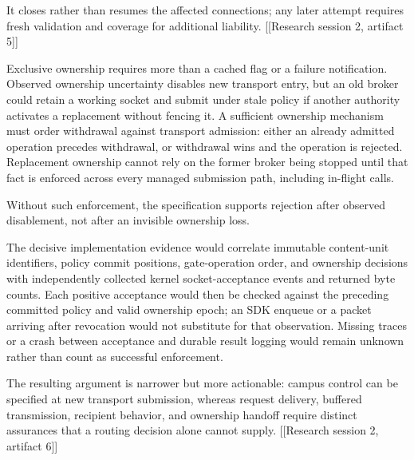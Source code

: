 \documentclass[11pt]{article}
\begin{document}
It closes rather than resumes the affected connections; any later attempt requires fresh validation and coverage for additional liability. [[Research session 2, artifact 5]]

Exclusive ownership requires more than a cached flag or a failure notification. Observed ownership uncertainty disables new transport entry, but an old broker could retain a working socket and submit under stale policy if another authority activates a replacement without fencing it. A sufficient ownership mechanism must order withdrawal against transport admission: either an already admitted operation precedes withdrawal, or withdrawal wins and the operation is rejected. Replacement ownership cannot rely on the former broker being stopped until that fact is enforced across every managed submission path, including in-flight calls.

Without such enforcement, the specification supports rejection after observed disablement, not after an invisible ownership loss.

The decisive implementation evidence would correlate immutable content-unit identifiers, policy commit positions, gate-operation order, and ownership decisions with independently collected kernel socket-acceptance events and returned byte counts. Each positive acceptance would then be checked against the preceding committed policy and valid ownership epoch; an SDK enqueue or a packet arriving after revocation would not substitute for that observation. Missing traces or a crash between acceptance and durable result logging would remain unknown rather than count as successful enforcement.

The resulting argument is narrower but more actionable: campus control can be specified at new transport submission, whereas request delivery, buffered transmission, recipient behavior, and ownership handoff require distinct assurances that a routing decision alone cannot supply. [[Research session 2, artifact 6]]
\end{document}
